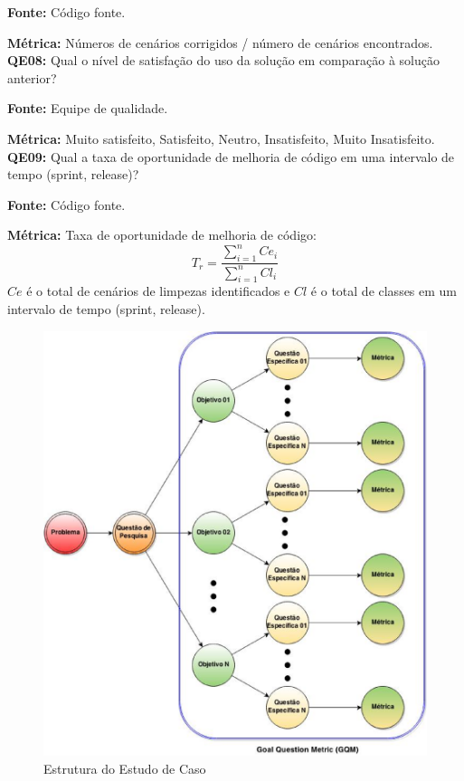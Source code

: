 \textbf{Fonte:} Código fonte.

\textbf{Métrica:} Números de cenários corrigidos / número de cenários encontrados.\\



\textbf{QE08: } Qual o nível de satisfação do uso da solução em comparação à solução anterior? 

\textbf{Fonte:} Equipe de qualidade.

\textbf{Métrica:} Muito satisfeito, Satisfeito, Neutro, Insatisfeito, Muito Insatisfeito.\\



\textbf{QE09: } Qual a taxa de oportunidade de melhoria de código em uma intervalo de tempo (sprint, release)? 

\textbf{Fonte:} Código fonte.

\textbf{Métrica:} Taxa de oportunidade de melhoria de código: $$ T_r =   \frac{{\sum_{i=1}^{n}{Ce_i}}}{\sum_{i=1}^{n}{Cl_i}} $$ $ Ce $ é o total de cenários de limpezas identificados e $ Cl $  é o total de classes em um intervalo de tempo (sprint, release).
	
\begin{figure}[h!]
\centering
\includegraphics[keepaspectratio=false,scale=0.5]{figuras/figuras_nilton/EstruturaEstudoCaso.eps}
\caption{Estrutura do Estudo de Caso}
\label{EstruturaEstudoCaso}
\end{figure}


